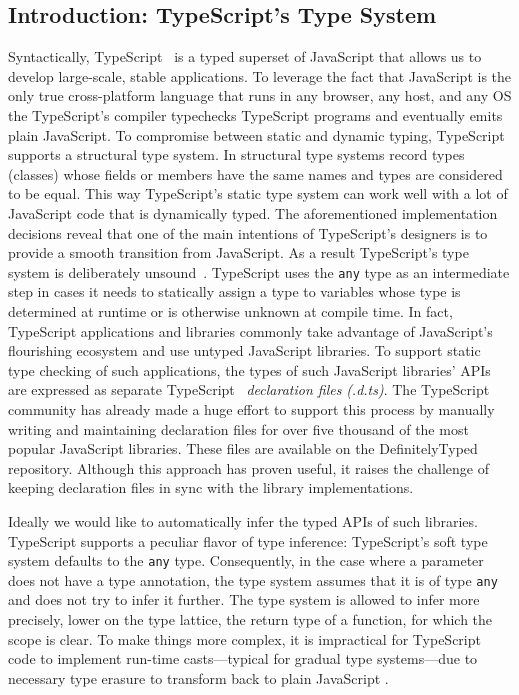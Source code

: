 \documentclass[sigplan,10pt,anonymous]{acmart} %
\theoremstyle{plain}
\theoremstyle{remark}
\theoremstyle{definition}
\begin{document}
\subsection{Introduction: TypeScript's Type System}\label{ssec:intro-typescript}
Syntactically, TypeScript~\citep{typescript} is a typed superset of
JavaScript that allows us to develop large-scale, stable applications.
To leverage the fact that JavaScript is the only true cross-platform
language that runs in any browser, any host, and any OS the TypeScript's
compiler typechecks TypeScript programs and eventually emits plain JavaScript.
To compromise between static and dynamic typing, TypeScript supports a
structural type system. In structural type systems record types (classes) whose fields or members have the same names and types are considered to be equal. This way TypeScript's static type system can work well with a lot of JavaScript code that is dynamically typed. The aforementioned implementation decisions
reveal that one of the main intentions of TypeScript's designers is to
provide a smooth transition from JavaScript. As a result TypeScript's type
system is deliberately unsound~\citep{understandtypescript}. TypeScript uses the
\texttt{any} type as an intermediate
step in cases it needs to statically assign a type to variables whose type is determined at runtime or is otherwise unknown at compile time.
In fact, TypeScript applications and libraries commonly take advantage of JavaScript's flourishing ecosystem and use untyped JavaScript
libraries. To support static type checking of such applications, the types of such JavaScript libraries' APIs are expressed as separate TypeScript
~\emph{declaration files} \textit{(.d.ts)}. The TypeScript community has already
made a huge effort to support this process by manually writing and maintaining
declaration files for over five thousand of the most popular JavaScript
libraries. These files are available on the DefinitelyTyped
\citep{definitelytyped} repository. Although this approach has proven
useful, it raises the challenge of keeping declaration files
in sync with the library implementations.

Ideally we would like to automatically infer the typed APIs of such
libraries. TypeScript supports a peculiar flavor of type inference: TypeScript's soft type system \citep{softtyping}
defaults to the \texttt{any} type. Consequently, in the case where a parameter does not
have a type annotation, the type system assumes that it is of type
\texttt{any} and does not try to infer it further. The type system is allowed to infer
more precisely, lower on the type lattice, the return type of a function, for
which the scope is clear. To make things more complex, it is impractical for
TypeScript code to implement run-time casts---typical for gradual type
systems---due to necessary type erasure to transform back to plain
JavaScript \citep{understandtypescript}.
\end{document}
